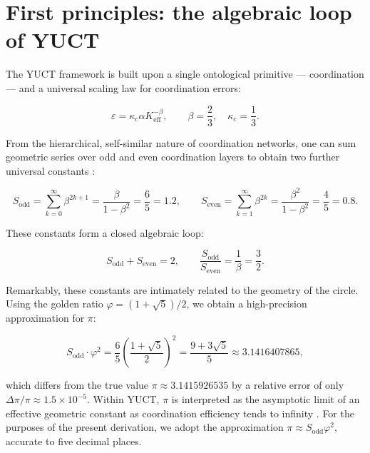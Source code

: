 \documentclass[11pt,a4paper]{article}
\begin{document}
	\section{First principles: the algebraic loop of YUCT}
	
	The YUCT framework is built upon a single ontological primitive — coordination — and a universal scaling law for coordination errors:
	
	\begin{equation}
		\varepsilon = \kappa_c \alpha K_{\mathrm{eff}}^{-\beta}, \qquad \beta = \frac{2}{3}, \quad \kappa_c = \frac{1}{3}.
	\end{equation}
	
	From the hierarchical, self-similar nature of coordination networks, one can sum geometric series over odd and even coordination layers to obtain two further universal constants \cite{AppendixFerra}:
	
	\begin{equation}
		S_{\mathrm{odd}} = \sum_{k=0}^{\infty} \beta^{2k+1} = \frac{\beta}{1-\beta^2} = \frac{6}{5} = 1.2, \qquad
		S_{\mathrm{even}} = \sum_{k=1}^{\infty} \beta^{2k} = \frac{\beta^2}{1-\beta^2} = \frac{4}{5} = 0.8.
	\end{equation}
	
	These constants form a closed algebraic loop:
	
	\begin{equation}
		S_{\mathrm{odd}} + S_{\mathrm{even}} = 2, \qquad \frac{S_{\mathrm{odd}}}{S_{\mathrm{even}}} = \frac{1}{\beta} = \frac{3}{2}.
	\end{equation}
	
	Remarkably, these constants are intimately related to the geometry of the circle. Using the golden ratio \(\varphi = (1+\sqrt{5})/2\), we obtain a high-precision approximation for \(\pi\):
	
	\begin{equation}
		S_{\mathrm{odd}} \cdot \varphi^2 = \frac{6}{5} \left( \frac{1+\sqrt{5}}{2} \right)^2 = \frac{9+3\sqrt{5}}{5} \approx 3.1416407865,
	\end{equation}
	
	which differs from the true value \(\pi \approx 3.1415926535\) by a relative error of only \(\Delta\pi/\pi \approx 1.5 \times 10^{-5}\). Within YUCT, \(\pi\) is interpreted as the asymptotic limit of an effective geometric constant as coordination efficiency tends to infinity \cite{AppendixEhrenfest}. For the purposes of the present derivation, we adopt the approximation \(\pi \approx S_{\mathrm{odd}}\varphi^2\), accurate to five decimal places.
	
\end{document}
